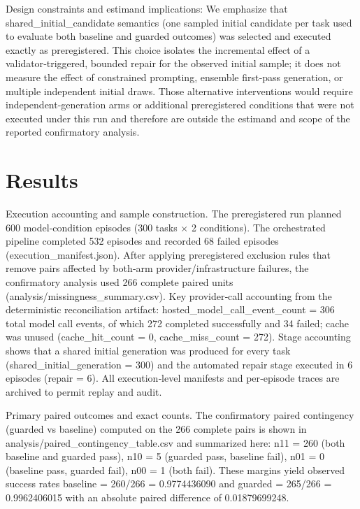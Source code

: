\documentclass[conference]{IEEEtran}
\begin{document}
Design constraints and estimand implications: We emphasize that shared\_initial\_candidate semantics (one sampled initial candidate per task used to evaluate both baseline and guarded outcomes) was selected and executed exactly as preregistered. This choice isolates the incremental effect of a validator‑triggered, bounded repair for the observed initial sample; it does not measure the effect of constrained prompting, ensemble first‑pass generation, or multiple independent initial draws. Those alternative interventions would require independent-generation arms or additional preregistered conditions that were not executed under this run and therefore are outside the estimand and scope of the reported confirmatory analysis.

\section{Results}
Execution accounting and sample construction. The preregistered run planned 600 model‑condition episodes (300 tasks \ensuremath{\times} 2 conditions). The orchestrated pipeline completed 532 episodes and recorded 68 failed episodes (execution\_manifest.json). After applying preregistered exclusion rules that remove pairs affected by both‑arm provider/infrastructure failures, the confirmatory analysis used 266 complete paired units (analysis/missingness\_summary.csv). Key provider‑call accounting from the deterministic reconciliation artifact: hosted\_model\_call\_event\_count = 306 total model call events, of which 272 completed successfully and 34 failed; cache was unused (cache\_hit\_count = 0, cache\_miss\_count = 272). Stage accounting shows that a shared initial generation was produced for every task (shared\_initial\_generation = 300) and the automated repair stage executed in 6 episodes (repair = 6). All execution‑level manifests and per‑episode traces are archived to permit replay and audit.

Primary paired outcomes and exact counts. The confirmatory paired contingency (guarded vs baseline) computed on the 266 complete pairs is shown in analysis/paired\_contingency\_table.csv and summarized here: n11 = 260 (both baseline and guarded pass), n10 = 5 (guarded pass, baseline fail), n01 = 0 (baseline pass, guarded fail), n00 = 1 (both fail). These margins yield observed success rates baseline = 260/266 = 0.9774436090 and guarded = 265/266 = 0.9962406015 with an absolute paired difference of 0.01879699248.
\end{document}
